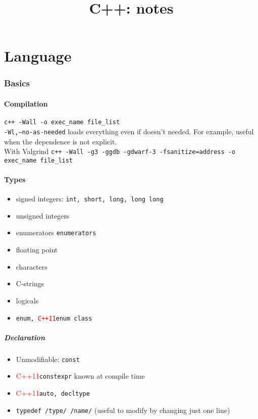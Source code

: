 \documentclass{article}
\newcommand{\code}[1]{\texttt {#1}}
\newcommand{\cxi}{\textcolor{red}{C++11}}
\begin{document}
\title{C++: notes}

\maketitle

\tableofcontents


\part{Language}


\section{Basics}

\subsection{Compilation}
\code{c++ -Wall -o exec\_name file\_list} \\

\code{-Wl,--no-as-needed} loads everything even if doesn't needed. For example, useful when the  dependence is not explicit. \\

With \textsf{Valgrind}
\code{c++ -Wall -g3 -ggdb -gdwarf-3 -fsanitize=address -o exec\_name file\_list} \\



\subsection{Types}
\begin{itemize}
 \item signed integers: \texttt{int, short, long, long long}
 \item unsigned integers
 \item enumerators \texttt{enumerators} 
 \item floating point
 \item characters
 \item C-strings
 \item logicals
 \item \code{enum, \cxi enum class}
\end{itemize}
\subsubsection{Declaration}
\begin{itemize}
 \item Unmodifiable: \texttt{const} 
 \item \cxi \texttt{constexpr} known at compile time
 \item \cxi \texttt{auto, decltype}
 \item \texttt{typedef /type/ /name/} (useful to modify by changing just one line)
\end{itemize}
\end{document}
